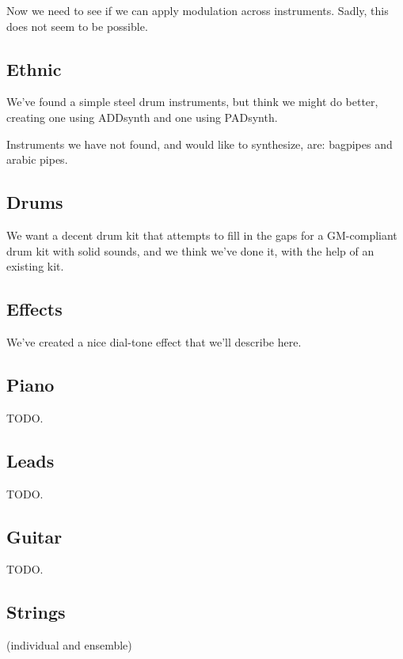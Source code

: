    Now we need to see if we can apply modulation across instruments.
   Sadly, this does not seem to be possible.

\subsection{Ethnic}
\label{subsec:cookbook_instruments_ethnic}

   We've found a simple steel drum instruments, but think we might do better,
   creating one using ADDsynth and one using PADsynth.

   Instruments we have not found, and would like to synthesize, are:
   bagpipes and arabic pipes.

\subsection{Drums}
\label{subsec:cookbook_instruments_drums}

   We want a decent drum kit that attempts to fill in the gaps for a
   GM-compliant drum kit with solid sounds, and we think we've done it, with
   the help of an existing kit.

\subsection{Effects}
\label{subsec:cookbook_instruments_effects}

   We've created a nice dial-tone effect that we'll describe here.

\subsection{Piano}
\label{subsec:cookbook_instruments_piano}

   TODO.

\subsection{Leads}
\label{subsec:cookbook_instruments_leads}

   TODO.

\subsection{Guitar}
\label{subsec:cookbook_instruments_guitar}

   TODO.

\subsection{Strings} (individual and ensemble)
\label{subsec:cookbook_instruments_strings}

